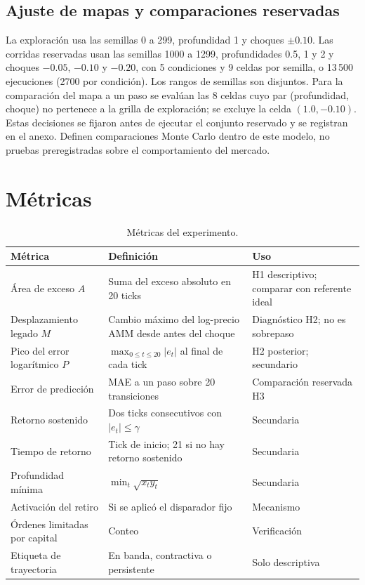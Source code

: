 \subsection{Ajuste de mapas y comparaciones reservadas}

La exploración usa las semillas 0 a 299, profundidad 1 y choques $\pm0.10$. Las corridas reservadas usan las semillas 1000 a 1299, profundidades 0.5, 1 y 2 y choques $-0.05$, $-0.10$ y $-0.20$, con 5 condiciones y 9 celdas por semilla, o 13\,500 ejecuciones (2700 por condición). Los rangos de semillas son disjuntos. Para la comparación del mapa a un paso se evalúan las 8 celdas cuyo par (profundidad, choque) no pertenece a la grilla de exploración; se excluye la celda $(1.0,-0.10)$. Estas decisiones se fijaron antes de ejecutar el conjunto reservado y se registran en el anexo. Definen comparaciones Monte Carlo dentro de este modelo, no pruebas preregistradas sobre el comportamiento del mercado.

\section{Métricas}

\begin{table}[htbp]
\centering
\caption{Métricas del experimento.}
\label{tab:metricas}
\small
\begin{tabularx}{\textwidth}{@{}l >{\raggedright\arraybackslash}X l@{}}
\toprule
Métrica & Definición & Uso \\
\midrule
Área de exceso $A$ & Suma del exceso absoluto en 20 ticks & H1 descriptivo; comparar con referente ideal \\
Desplazamiento legado $M$ & Cambio máximo del log-precio AMM desde antes del choque & Diagnóstico H2; no es sobrepaso \\
Pico del error logarítmico $P$ & $\max_{0\le t\le20}|e_t|$ al final de cada tick & H2 posterior; secundario \\
Error de predicción & MAE a un paso sobre 20 transiciones & Comparación reservada H3 \\
Retorno sostenido & Dos ticks consecutivos con $|e_t|\le\gamma$ & Secundaria \\
Tiempo de retorno & Tick de inicio; 21 si no hay retorno sostenido & Secundaria \\
Profundidad mínima & $\min_t\sqrt{x_ty_t}$ & Secundaria \\
Activación del retiro & Si se aplicó el disparador fijo & Mecanismo \\
Órdenes limitadas por capital & Conteo & Verificación \\
Etiqueta de trayectoria & En banda, contractiva o persistente & Solo descriptiva \\
\bottomrule
\end{tabularx}
\end{table}

